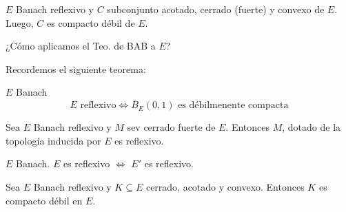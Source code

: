 \begin{cor}\label{cor:corolario-2}
$E$ Banach reflexivo y $C$ subconjunto acotado, cerrado (fuerte) y convexo de $E$. Luego, $C$ es compacto débil de $E$.
\end{cor}















\renewcommand{\catnum}{\theNPclase \ No Presencial}%
\renewcommand{\fecha}{01 de junio de 2020}


¿Cómo aplicamos el Teo. de BAB a $E$?

Recordemos el siguiente teorema:
\begin{thm}\label{teo1:Erefl-Edual-refl}
$E$ Banach
\begin{equation*}
    E \text{ reflexivo} \iff \overline{B}_E(0, 1) \text{ es débilmenente compacta}
\end{equation*}
\end{thm}

\begin{prop}\label{prop:prop1}
Sea $E$ Banach reflexivo y $M$ sev cerrado fuerte de $E$. Entonces $M$, dotado de la topología inducida por $E$ es reflexivo.
\end{prop}

\begin{cor}\label{coro:corolario1-E-refl-Edual-refl}
$E$ Banach. $E$ es reflexivo $\iff$ $E'$ es reflexivo.
\end{cor}

\begin{cor}\label{coro:corolario2}
Sea $E$ Banach reflexivo y $K \subseteq E$ cerrado, acotado y convexo. Entonces $K$ es compacto débil en $E$.
\end{cor}

